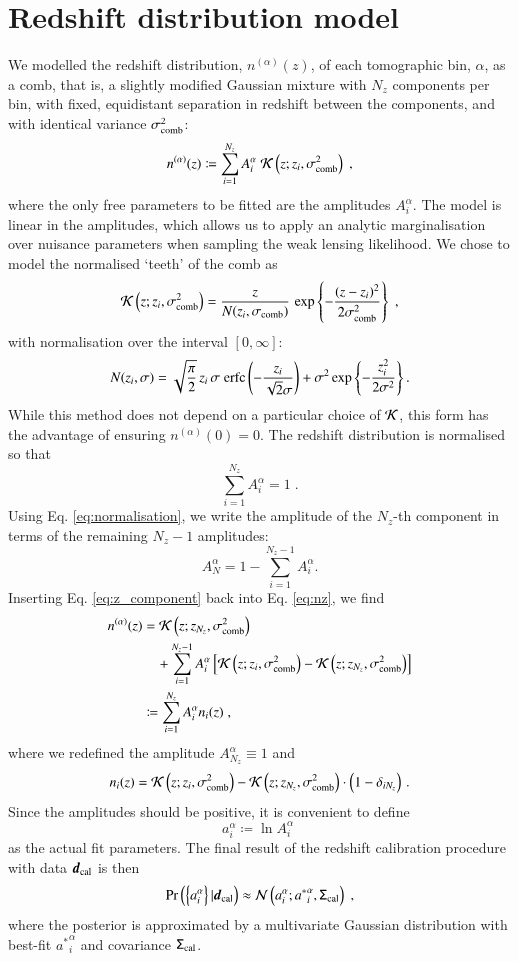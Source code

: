 \documentclass{aa}
\newcommand{\eq}[1]{\begin{equation}  #1 \end{equation}}
\newcommand{\eqa}[1]{\begin{align}   #1 \end{align}}
\newcommand{\br}[1]{\left( #1 \right)}
\newcommand{\bc}[1]{\left\{ #1 \right\}}
\newcommand{\bb}[1]{\left[ #1 \right]}
\newcommand{\nn}{\nonumber}
\newcommand{\pr}{{\rm Pr}}
\begin{document}
\section{Redshift distribution model  }
\label{sec:comb}
We modelled the redshift distribution, $n^{(\alpha)}(z)$, of each tomographic bin, $\alpha$, as a comb, that is, a slightly modified Gaussian mixture with $N_z$ components per bin, with fixed, equidistant separation in redshift between the components, and with identical variance $\sigma_{\rm comb}^2$:
\eq{
\label{eq:nz}
n^{(\alpha)}(z) \coloneqq \sum_{i=1}^{N_z} A_i^\alpha\; {\cal K}\br{z; z_i, \sigma_{\rm comb}^2}\;,
}
where the only free parameters to be fitted are the amplitudes $A_i^\alpha$. The model is linear in the amplitudes, which allows us to apply an analytic marginalisation over nuisance parameters when sampling the weak lensing likelihood. We chose to model the normalised `teeth' of the comb as
\eq{
\label{eq:basis_function}
{\cal K} \br{z; z_i, \sigma_{\rm comb}^2} = \frac{z}{N(z_i, \sigma_{\rm comb})}\, \exp \bc{- \frac{(z-z_i)^2}{2 \sigma_{\rm comb}^2} }\;, 
}
with normalisation over the interval $\bb{0,\infty}$:
\eq{
N(z_i, \sigma) = \sqrt{\frac{\pi}{2}}\, z_i\, \sigma\; {\rm erfc} \br{-\frac{z_i}{\sqrt{2} \sigma}} + \sigma^2 \exp \bc{-\frac{z_i^2}{2 \sigma^2}}.
}
While this method does not depend on a particular choice of ${\cal K}$, this form has the advantage of ensuring $n^{(\alpha)}(0)=0$. The redshift distribution is normalised so that
\eq{
\label{eq:normalisation}
\sum_{i=1}^{N_z} A_i^\alpha = 1\;.
}
Using Eq. \eqref{eq:normalisation}, we write the amplitude of the $N_z$-th component in terms of the remaining $N_z -1$ amplitudes:
\eq{
\label{eq:z_component}
A_N^\alpha = 1- \sum_{i=1}^{N_z-1} A_i^\alpha.
}
Inserting Eq. \eqref{eq:z_component} back into Eq. \eqref{eq:nz}, we find
\eqa{
\label{eq:comb_nz}
n^{(\alpha)}(z) &= {\cal K}\br{z; z_{N_z}, \sigma_{\rm comb}^2} \\ \nn
& ~~~~+ \sum_{i=1}^{N_z-1} A_i^\alpha \bb{ {\cal K}\br{z; z_i, \sigma_{\rm comb}^2}  - {\cal K}\br{z; z_{N_z}, \sigma_{\rm comb}^2} } \\ 
&\coloneqq \sum_{i=1}^{N_z} A_i^\alpha n_i(z)\;,
}
where we redefined the amplitude $A_{N_z}^\alpha \equiv 1$ and
\eq{
n_i(z) ={\cal K}\br{z; z_i, \sigma_{\rm comb}^2}  - {\cal K}\br{z; z_{N_z}, \sigma_{\rm comb}^2}\cdot \left(1-\delta_{iN_z}\right)\,.
}
Since the amplitudes should be positive, it is convenient to define
\eq{
a_i^\alpha \coloneqq \ln A_i^\alpha\;
}
as the actual fit parameters. The final result of the redshift calibration procedure with data $\boldsymbol{d}_{\rm cal}$ is then
\eq{
\label{eq:posterior}
\pr \br{ \bc{a_i^\alpha} | \boldsymbol{d}_{\rm cal}} \approx {\cal N}\br{ a_i^\alpha; {a^*}_i^\alpha, \tens{\Sigma}_{\rm cal}}\;,
}
where the posterior is approximated by a multivariate Gaussian distribution with best-fit ${a^*}_i^\alpha$ and covariance $\mathsf{\Sigma}_{\rm cal}$.
\end{document}
